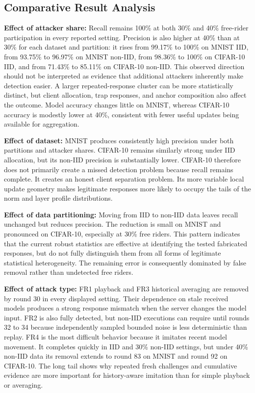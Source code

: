 \documentclass[conference]{IEEEtran}
\begin{document}
\subsection{Comparative Result Analysis}
\textbf{Effect of attacker share:}
Recall remains 100\% at both 30\% and 40\% free-rider participation in every reported setting. Precision is also higher at 40\% than at 30\% for each dataset and partition: it rises from 99.17\% to 100\% on MNIST IID, from 93.75\% to 96.97\% on MNIST non-IID, from 98.36\% to 100\% on CIFAR-10 IID, and from 71.43\% to 85.11\% on CIFAR-10 non-IID. This observed direction should not be interpreted as evidence that additional attackers inherently make detection easier. A larger repeated-response cluster can be more statistically distinct, but client allocation, trap responses, and anchor composition also affect the outcome. Model accuracy changes little on MNIST, whereas CIFAR-10 accuracy is modestly lower at 40\%, consistent with fewer useful updates being available for aggregation.

\textbf{Effect of dataset:}
MNIST produces consistently high precision under both partitions and attacker shares. CIFAR-10 remains similarly strong under IID allocation, but its non-IID precision is substantially lower. CIFAR-10 therefore does not primarily create a missed detection problem because recall remains complete. It creates an honest client separation problem. Its more variable local update geometry makes legitimate responses more likely to occupy the tails of the norm and layer profile distributions.

\textbf{Effect of data partitioning:}
Moving from IID to non-IID data leaves recall unchanged but reduces precision. The reduction is small on MNIST and pronounced on CIFAR-10, especially at 30\% free riders. This pattern indicates that the current robust statistics are effective at identifying the tested fabricated responses, but do not fully distinguish them from all forms of legitimate statistical heterogeneity. The remaining error is consequently dominated by false removal rather than undetected free riders.

\textbf{Effect of attack type:}
FR1 playback and FR3 historical averaging are removed by round 30 in every displayed setting. Their dependence on stale received models produces a strong response mismatch when the server changes the model input. FR2 is also fully detected, but non-IID executions can require until rounds 32 to 34 because independently sampled bounded noise is less deterministic than replay. FR4 is the most difficult behavior because it imitates recent model movement. It completes quickly in IID and 30\% non-IID settings, but under 40\% non-IID data its removal extends to round 83 on MNIST and round 92 on CIFAR-10. The long tail shows why repeated fresh challenges and cumulative evidence are more important for history-aware imitation than for simple playback or averaging.
\end{document}
